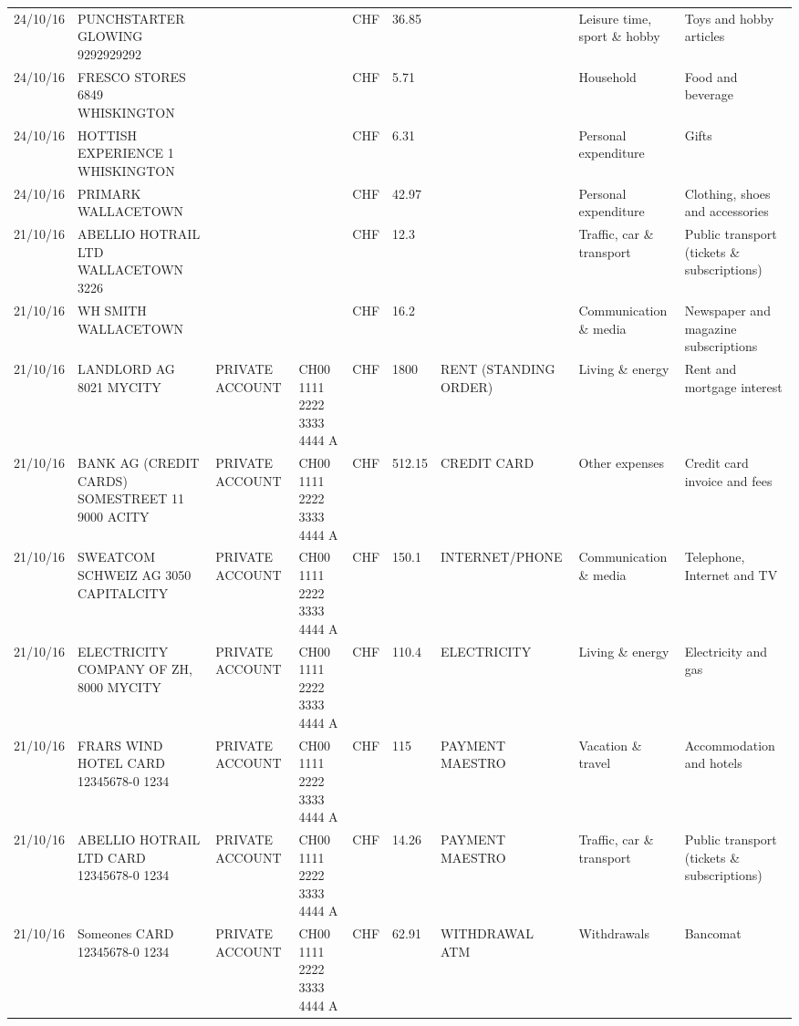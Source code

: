 \begin{landscape}
\begin{table}[t]
\begin{center}
\begin{tabular}{lllllllll}
		24/10/16 & PUNCHSTARTER GLOWING   9292929292 &       &       & CHF   & 36.85 &       & Leisure time, sport \& hobby & Toys and hobby articles \\
		24/10/16 & FRESCO STORES 6849        WHISKINGTON &       &       & CHF   & 5.71  &       & Household & Food and beverage \\
		24/10/16 & HOTTISH EXPERIENCE 1    WHISKINGTON &       &       & CHF   & 6.31  &       & Personal expenditure & Gifts \\
		24/10/16 & PRIMARK                  WALLACETOWN &       &       & CHF   & 42.97 &       & Personal expenditure & Clothing, shoes and accessories \\
		21/10/16 & ABELLIO HOTRAIL LTD     WALLACETOWN 3226 &       &       & CHF   & 12.3  &       & Traffic, car \& transport & Public transport (tickets \& subscriptions) \\
		21/10/16 & WH SMITH                 WALLACETOWN &       &       & CHF   & 16.2  &       & Communication \& media & Newspaper and magazine subscriptions \\
		21/10/16 & LANDLORD AG 8021 MYCITY & PRIVATE ACCOUNT & CH00 1111 2222 3333 4444 A & CHF   & 1800  & RENT (STANDING ORDER) & Living \& energy & Rent and mortgage interest \\
		21/10/16 & BANK AG (CREDIT CARDS) SOMESTREET 11 9000 ACITY & PRIVATE ACCOUNT & CH00 1111 2222 3333 4444 A & CHF   & 512.15 & CREDIT CARD & Other expenses & Credit card invoice and fees \\
		21/10/16 & SWEATCOM SCHWEIZ AG 3050 CAPITALCITY & PRIVATE ACCOUNT & CH00 1111 2222 3333 4444 A & CHF   & 150.1 & INTERNET/PHONE & Communication \& media & Telephone,  Internet and TV \\
		21/10/16 & ELECTRICITY COMPANY OF ZH, 8000 MYCITY & PRIVATE ACCOUNT & CH00 1111 2222 3333 4444 A & CHF   & 110.4 & ELECTRICITY & Living \& energy & Electricity and gas \\
		21/10/16 & FRARS WIND HOTEL CARD 12345678-0 1234 & PRIVATE ACCOUNT & CH00 1111 2222 3333 4444 A & CHF   & 115   & PAYMENT MAESTRO & Vacation \& travel & Accommodation and hotels \\
		21/10/16 & ABELLIO HOTRAIL LTD CARD 12345678-0 1234 & PRIVATE ACCOUNT & CH00 1111 2222 3333 4444 A & CHF   & 14.26 & PAYMENT MAESTRO & Traffic, car \& transport & Public transport (tickets \& subscriptions) \\
		21/10/16 & Someones CARD 12345678-0 1234 & PRIVATE ACCOUNT & CH00 1111 2222 3333 4444 A & CHF   & 62.91 & WITHDRAWAL ATM & Withdrawals & Bancomat \\

\end{tabular}
\end{center}
\end{table}
\end{landscape}
